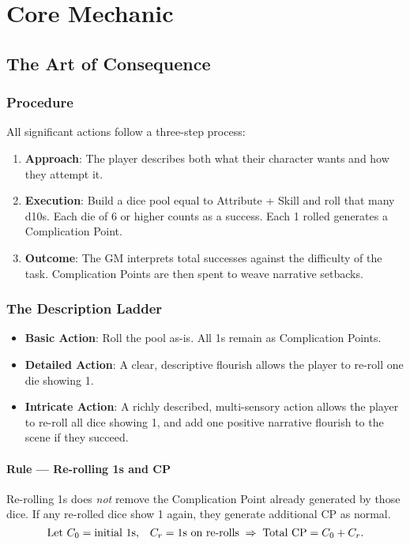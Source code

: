 \documentclass[11pt]{article}
\begin{document}
\section{Core Mechanic}

\subsection{The Art of Consequence}

\subsubsection{Procedure}
All significant actions follow a three-step process:
\begin{enumerate}
    \item \textbf{Approach}: The player describes both what their character wants and how they attempt it.
    \item \textbf{Execution}: Build a dice pool equal to Attribute + Skill and roll that many d10s. Each die of 6 or higher counts as a success. Each 1 rolled generates a Complication Point.
    \item \textbf{Outcome}: The GM interprets total successes against the difficulty of the task. Complication Points are then spent to weave narrative setbacks.
\end{enumerate}

\subsubsection{The Description Ladder}
\begin{itemize}
    \item \textbf{Basic Action}: Roll the pool as-is. All 1s remain as Complication Points.
    \item \textbf{Detailed Action}: A clear, descriptive flourish allows the player to re-roll one die showing 1.
    \item \textbf{Intricate Action}: A richly described, multi-sensory action allows the player to re-roll all dice showing 1, and add one positive narrative flourish to the scene if they succeed.
\end{itemize}

\paragraph{Rule — Re-rolling 1s and CP}
Re-rolling 1s does \emph{not} remove the Complication Point already generated by those dice. If any re-rolled dice show 1 again, they generate additional CP as normal.
\[
\text{Let } C_{0}=\text{initial 1s,\quad } C_{r}=\text{1s on re-rolls}\;\Rightarrow\; \text{Total CP}=C_{0}+C_{r}.
\]
\end{document}
